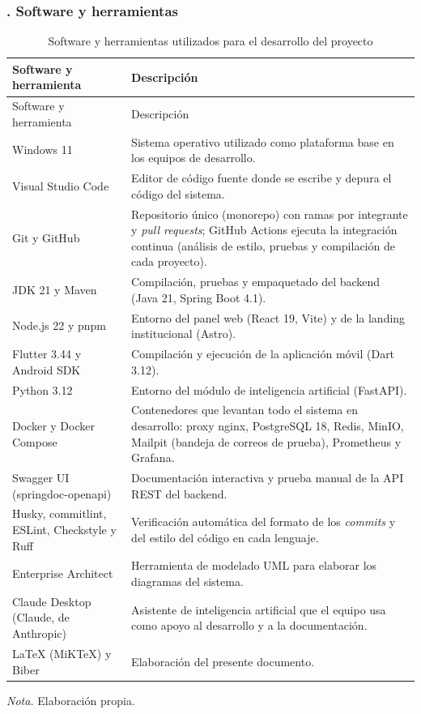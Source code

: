 \subsubsection{. Software y herramientas}\label{sec:recursos_software}

\begin{longtable}{>{\raggedright\arraybackslash}p{4.5cm} >{\raggedright\arraybackslash}p{8.5cm}}
\caption{Software y herramientas utilizados para el desarrollo del proyecto}\label{tab:software_herramientas}\\
\toprule
Software y herramienta & Descripción \\
\midrule
\endfirsthead
\toprule
Software y herramienta & Descripción \\
\midrule
\endhead
\bottomrule
\endfoot
Windows 11 & Sistema operativo utilizado como plataforma base en los equipos de desarrollo. \\
Visual Studio Code & Editor de código fuente donde se escribe y depura el código del sistema. \\
Git y GitHub & Repositorio único (monorepo) con ramas por integrante y \textit{pull requests}; GitHub Actions ejecuta la integración continua (análisis de estilo, pruebas y compilación de cada proyecto). \\
JDK 21 y Maven & Compilación, pruebas y empaquetado del backend (Java 21, Spring Boot 4.1). \\
Node.js 22 y pnpm & Entorno del panel web (React 19, Vite) y de la landing institucional (Astro). \\
Flutter 3.44 y Android SDK & Compilación y ejecución de la aplicación móvil (Dart 3.12). \\
Python 3.12 & Entorno del módulo de inteligencia artificial (FastAPI). \\
Docker y Docker Compose & Contenedores que levantan todo el sistema en desarrollo: proxy nginx, PostgreSQL 18, Redis, MinIO, Mailpit (bandeja de correos de prueba), Prometheus y Grafana. \\
Swagger UI (springdoc-openapi) & Documentación interactiva y prueba manual de la API REST del backend. \\
Husky, commitlint, ESLint, Checkstyle y Ruff & Verificación automática del formato de los \textit{commits} y del estilo del código en cada lenguaje. \\
Enterprise Architect & Herramienta de modelado UML para elaborar los diagramas del sistema. \\
Claude Desktop (Claude, de Anthropic) & Asistente de inteligencia artificial que el equipo usa como apoyo al desarrollo y a la documentación. \\
LaTeX (MiKTeX) y Biber & Elaboración del presente documento. \\
\bottomrule
\end{longtable}
\noindent\textit{Nota.} Elaboración propia.


